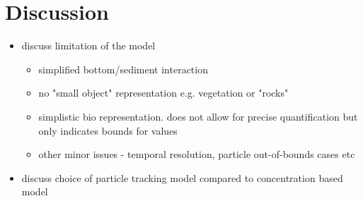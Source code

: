 \section*{Discussion}
\begin{itemize}
    \item discuss limitation of the model
    \begin{itemize}
        \item simplified bottom/sediment interaction
        \item no "small object" representation e.g. vegetation or "rocks"
        \item simplistic bio representation. does not allow for precise quantification but only indicates bounds for values
        \item other minor issues - temporal resolution, particle out-of-bounds cases etc
    \end{itemize}
    \item discuss choice of particle tracking model compared to concentration based model
\end{itemize}



